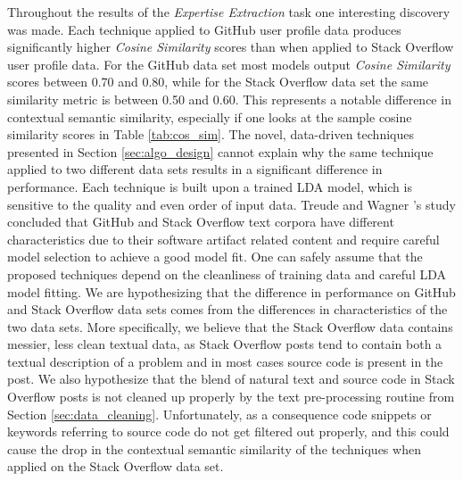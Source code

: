         Throughout the results of the \emph{Expertise Extraction} task one interesting discovery was made. Each technique applied to GitHub user profile data produces significantly higher \emph{Cosine Similarity} scores than when applied to Stack Overflow user profile data. For the GitHub data set most models output \emph{Cosine Similarity} scores between 0.70 and 0.80, while for the Stack Overflow data set the same similarity metric is between 0.50 and 0.60. This represents a notable difference in contextual semantic similarity, especially if one looks at the sample cosine similarity scores in Table \ref{tab:cos_sim}. The novel, data-driven techniques presented in Section \ref{sec:algo_design} cannot explain why the same technique applied to two different data sets results in a significant difference in performance. Each technique is built upon a trained LDA model, which is sensitive to the quality and even order of input data. Treude and Wagner \cite{treude2019predicting}'s study concluded that GitHub and Stack Overflow text corpora have different characteristics due to their software artifact related content and require careful model selection to achieve a good model fit. One can safely assume that the proposed techniques depend on the cleanliness of training data and careful LDA model fitting. We are hypothesizing that the difference in performance on GitHub and Stack Overflow data sets comes from the differences in characteristics of the two data sets. More specifically, we believe that the Stack Overflow data contains messier, less clean textual data, as Stack Overflow posts tend to contain both a textual description of a problem and in most cases source code is present in the post. We also hypothesize that the blend of natural text and source code in Stack Overflow posts is not cleaned up properly by the text pre-processing routine from Section \ref{sec:data_cleaning}. Unfortunately, as a consequence code snippets or keywords referring to source code do not get filtered out properly, and this could cause the drop in the contextual semantic similarity of the techniques when applied on the Stack Overflow data set.
        
